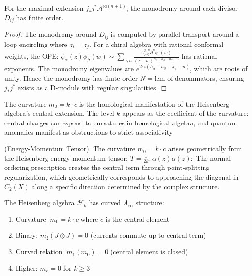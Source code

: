 \begin{theorem}\label{thm:monodromy-finite}
For the maximal extension $j_*j^*\mathcal{A}^{\boxtimes(n+1)}$, the monodromy around each divisor $D_{ij}$ has finite order.
\end{theorem}

\begin{proof}
The monodromy around $D_{ij}$ is computed by parallel transport around a loop encircling where $z_i = z_j$. For a chiral algebra with rational conformal weights, the OPE:
$\phi_\alpha(z)\phi_\beta(w) \sim \sum_{\gamma,n} \frac{C^{\gamma,n}_{\alpha\beta}\partial^n\phi_\gamma(w)}{(z-w)^{h_\alpha + h_\beta - h_\gamma - n}}$
has rational exponents. The monodromy eigenvalues are $e^{2\pi i(h_\alpha + h_\beta - h_\gamma - n)}$, which are roots of unity. Hence the monodromy has finite order $N = \text{lcm}$ of denominators, ensuring $j_*j^*$ exists as a D-module with regular singularities.
\end{proof}

\begin{remark}
The curvature $m_0 = k \cdot c$ is the homological manifestation of the Heisenberg algebra's central extension. The level $k$ appears as the coefficient of the curvature: central charges correspond to curvatures in homological algebra, and quantum anomalies manifest as obstructions to strict associativity.
\end{remark}

\begin{remark} (Energy-Momentum Tensor). The curvature $m_0 = k \cdot c$ arises geometrically from the Heisenberg energy-momentum tensor:
$T = \frac{1}{2k} :\alpha(z)\alpha(z):$
The normal ordering prescription creates the central term through point-splitting regularization, which geometrically corresponds to approaching the diagonal in $C_2(X)$ along a specific direction determined by the complex structure.
\end{remark}

\begin{theorem}
\label{thm:heisenberg-curved-structure}
The Heisenberg algebra $\mathcal{H}_k$ has curved $A_\infty$ structure:
\begin{enumerate}
\item Curvature: $m_0 = k \cdot c$ where $c$ is the central element
\item Binary: $m_2(J \otimes J) = 0$ (currents commute up to central term)
\item Curved relation: $m_1(m_0) = 0$ (central element is closed)
\item Higher: $m_k = 0$ for $k \geq 3$ 
\end{enumerate}
\end{theorem}

